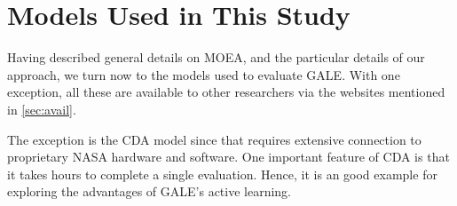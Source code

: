 \documentclass[10pt,journal,compsoc]{IEEEtran}
\newcommand{\tion}[1]{\textsection\ref{sec:#1}}
\begin{document}



 

\section{Models Used in This Study}\label{sec:models}
Having described general details on MOEA, and the particular details of our approach, we turn now to the models used to evaluate GALE.
With one exception, all these  are available to other researchers via the websites mentioned in \tion{avail}. 

The exception is the CDA model since that requires extensive connection to proprietary NASA hardware and software. One important feature of
CDA is that it takes hours to complete
a single evaluation. Hence, it is an good example for exploring
the advantages of  GALE's active learning.





 
\end{document}
